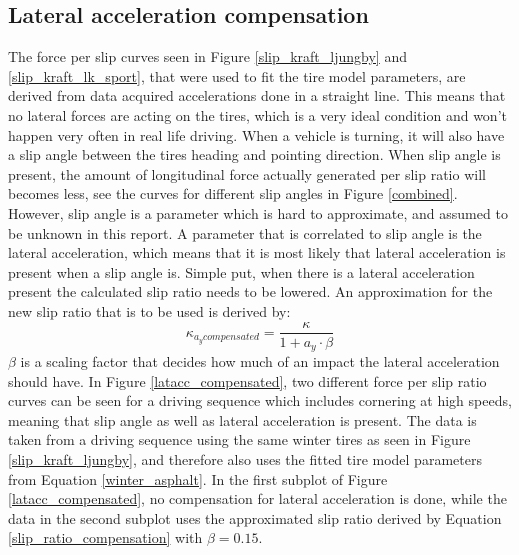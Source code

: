 \subsection{Lateral acceleration compensation}
\label{sec:latacccomp}
The force per slip curves seen in Figure \ref{slip_kraft_ljungby} and \ref{slip_kraft_lk_sport}, that were used to fit the tire model parameters, are derived from data acquired accelerations done in a straight line. This means that no lateral forces are acting on the tires, which is a very ideal condition and won't happen very often in real life driving. When a vehicle is turning, it will also have a slip angle between the tires heading and pointing direction. When slip angle is present, the amount of longitudinal force actually generated per slip ratio will becomes less, see the curves for different slip angles in Figure \ref{combined}. However, slip angle is a parameter which is hard to approximate, and assumed to be unknown in this report. A parameter that is correlated to slip angle is the lateral acceleration, which means that it is most likely that lateral acceleration is present when a slip angle is. Simple put, when there is a lateral acceleration present the calculated slip ratio needs to be lowered. An approximation for the new slip ratio that is to be used is derived by:
\begin{equation}
\label{slip_ratio_compensation}
\kappa_{a_{y} compensated} = \dfrac{\kappa}{1 + a_{y}\cdot \beta}
\end{equation}
$ \beta $ is a scaling factor that decides how much of an impact the lateral acceleration should have. In Figure \ref{latacc_compensated}, two different force per slip ratio curves can be seen for a driving sequence which includes cornering at high speeds, meaning that slip angle as well as lateral acceleration is present. The data is taken from a driving sequence using the same winter tires as seen in Figure \ref{slip_kraft_ljungby}, and therefore also uses the fitted tire model parameters from Equation \ref{winter_asphalt}. In the first subplot of Figure \ref{latacc_compensated}, no compensation for lateral acceleration is done, while the data in the second subplot uses the approximated slip ratio derived by Equation \ref{slip_ratio_compensation} with $ \beta = 0.15 $. 

